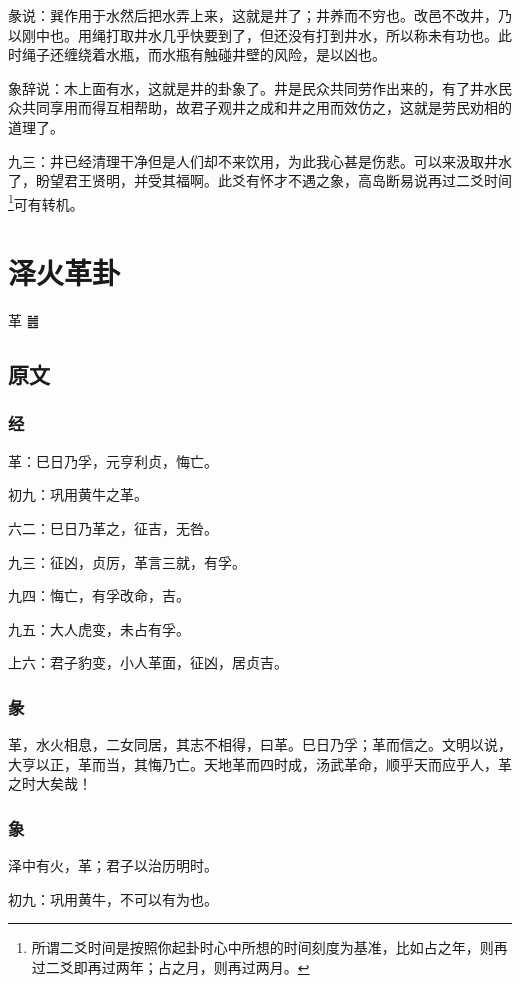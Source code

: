 \documentclass[12pt,oneside]{book}
\begin{document}
彖说：巽作用于水然后把水弄上来，这就是井了；井养而不穷也。改邑不改井，乃以刚中也。用绳打取井水几乎快要到了，但还没有打到井水，所以称未有功也。此时绳子还缠绕着水瓶，而水瓶有触碰井壁的风险，是以凶也。

象辞说：木上面有水，这就是井的卦象了。井是民众共同劳作出来的，有了井水民众共同享用而得互相帮助，故君子观井之成和井之用而效仿之，这就是劳民劝相的道理了。



九三：井已经清理干净但是人们却不来饮用，为此我心甚是伤悲。可以来汲取井水了，盼望君王贤明，并受其福啊。此爻有怀才不遇之象，高岛断易说再过二爻时间\footnote{所谓二爻时间是按照你起卦时心中所想的时间刻度为基准，比如占之年，则再过二爻即再过两年；占之月，则再过两月。}可有转机。


\chapter{泽火革卦}
革 {\Large ䷰}

\section{原文}

\subsection{经}
革：巳日乃孚，元亨利贞，悔亡。

初九：巩用黄牛之革。

六二：巳日乃革之，征吉，无咎。

九三：征凶，贞厉，革言三就，有孚。

九四：悔亡，有孚改命，吉。

九五：大人虎变，未占有孚。

上六：君子豹变，小人革面，征凶，居贞吉。

\subsection{彖}
革，水火相息，二女同居，其志不相得，曰革。巳日乃孚；革而信之。文明以说，大亨以正，革而当，其悔乃亡。天地革而四时成，汤武革命，顺乎天而应乎人，革之时大矣哉！

\subsection{象}
泽中有火，革；君子以治历明时。

初九：巩用黄牛，不可以有为也。
\end{document}
